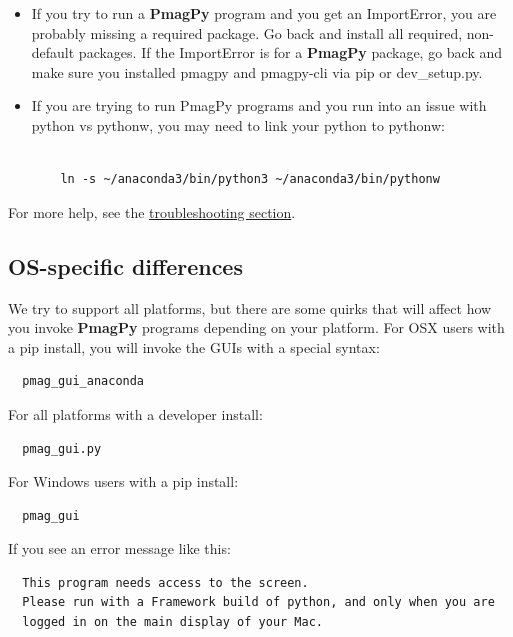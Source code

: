 \documentclass[11pt]{book}
\begin{document}
{\begin{itemize}
If you have Python 2.7 or a non-Anaconda Python, you will need to go back and install Anaconda Python.  If you installed Canopy Python at any point, make sure you uninstall it first.


\item If you try to run a {\bf PmagPy} program and you get an ImportError, you are probably missing a required package.  Go back and install all required, non-default packages.  If the ImportError is for a {\bf PmagPy} package, go back and make sure you installed pmagpy and pmagpy-cli via pip or dev\_setup.py.

\item If you are trying to run PmagPy programs and you run into an issue with python vs pythonw, you may need to link your python to pythonw:
  \begin{verbatim}

    ln -s ~/anaconda3/bin/python3 ~/anaconda3/bin/pythonw

    \end{verbatim}

\end{itemize}

For more help, see the \href{#trouble}{troubleshooting section}.

    \subsection {OS-specific differences}
    We try to support all platforms, but there are some quirks that will affect how you invoke {\bf PmagPy} programs depending on your platform.  For OSX users with a pip install, you will invoke the GUIs with a special syntax:

\begin{verbatim}
  pmag_gui_anaconda
\end{verbatim}

For all platforms with a developer install:

\begin{verbatim}
  pmag_gui.py
\end{verbatim}

For Windows users with a pip install:

\begin{verbatim}
  pmag_gui
\end{verbatim}


If you see an error message like this:

\begin{verbatim}
  This program needs access to the screen.
  Please run with a Framework build of python, and only when you are
  logged in on the main display of your Mac.
\end{verbatim}

}
\end{document}
